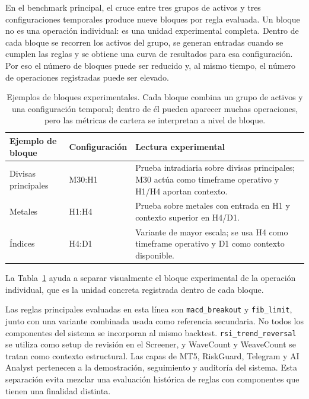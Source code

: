 En el benchmark principal, el cruce entre tres grupos de activos y tres
configuraciones temporales produce nueve bloques por regla evaluada. Un bloque
no es una operaci\'on individual: es una unidad experimental completa. Dentro de
cada bloque se recorren los activos del grupo, se generan entradas cuando se
cumplen las reglas y se obtiene una curva de resultados para esa configuraci\'on.
Por eso el n\'umero de bloques puede ser reducido y, al mismo tiempo, el n\'umero
de operaciones registradas puede ser elevado.

\begin{table}[H]
\centering
\small
\begin{tabular}{p{} p{} p{}}
\hline
\textbf{Ejemplo de bloque} & \textbf{Configuraci\'on} & \textbf{Lectura experimental} \\
\hline
Divisas principales & M30:H1 & Prueba intradiaria sobre divisas principales; M30 act\'ua como timeframe operativo y H1/H4 aportan contexto. \\
Metales & H1:H4 & Prueba sobre metales con entrada en H1 y contexto superior en H4/D1. \\
\'Indices & H4:D1 & Variante de mayor escala; se usa H4 como timeframe operativo y D1 como contexto disponible. \\
\hline
\end{tabular}
\caption[Ejemplos de bloques experimentales]{Ejemplos de bloques experimentales. Cada bloque combina un grupo de
activos y una configuraci\'on temporal; dentro de \'el pueden aparecer muchas
operaciones, pero las m\'etricas de cartera se interpretan a nivel de bloque.}
\label{tab:ejemplos-bloques-experimentales}
\end{table}

La Tabla~\ref{tab:ejemplos-bloques-experimentales} ayuda a separar visualmente
el bloque experimental de la operaci\'on individual, que es la unidad concreta
registrada dentro de cada bloque.

Las reglas principales evaluadas en esta l\'inea son \texttt{macd\_breakout} y
\texttt{fib\_limit}, junto con una variante combinada usada como referencia
secundaria. No todos los componentes del sistema se incorporan al mismo backtest.
\texttt{rsi\_trend\_reversal} se utiliza como setup de revisi\'on en el Screener,
y WaveCount y WeaveCount se tratan como contexto estructural. Las capas de MT5,
RiskGuard, Telegram y AI Analyst pertenecen a la demostraci\'on, seguimiento y
auditor\'ia del sistema. Esta separaci\'on evita mezclar una evaluaci\'on
hist\'orica de reglas con componentes que tienen una finalidad distinta.

